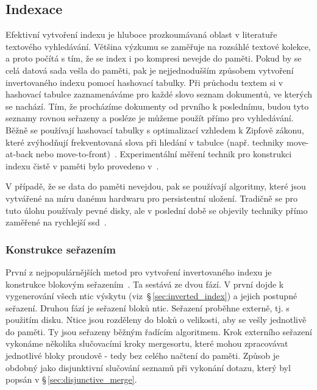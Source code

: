 \documentclass[11pt,letterpaper,oneside,openright]{book}
\begin{document}
\subsection{Indexace}
Efektivní vytvoření indexu je hluboce prozkoumávaná oblast v literatuře
textového vyhledávání. Většina výzkumu se zaměřuje na rozsáhlé textové kolekce,
a proto počítá s tím, že se index i po kompresi nevejde do paměti. Pokud by se
celá datová sada vešla do paměti, pak je nejjednodušším způsobem vytvoření
invertovaného indexu pomocí hashovací tabulky. Při průchodu textem si v
hashovací tabulce zaznamenáváme pro každé slovo seznam dokumentů, ve kterých se
nachází. Tím, že procházíme dokumenty od prvního k poslednímu, budou tyto
seznamy rovnou seřazeny a posléze je můžeme použít přímo pro vyhledávání. Běžně
se používají hashovací tabulky s optimalizací vzhledem k Zipfově zákonu, které
zvýhodňují frekventovaná slova při hledání v tabulce (např. techniky
move-at-back nebo move-to-front)~\cite{ZOBEL2001271}. Experimentální měření
technik pro konstrukci indexu čistě v paměti bylo provedeno
v~\cite{Buttcher05memorymanagement}.

V případě, že se data do paměti nevejdou, pak se používají algoritmy, které
jsou vytvářené na míru danému hardwaru pro persistentní uložení. Tradičně se
pro tuto úlohu používaly pevné disky, ale v poslední době se objevily techniky
přímo zaměřené na rychlejší ssd~\cite{Jung201525}.

\subsubsection{Konstrukce seřazením}
První z nejpopulárnějších metod pro vytvoření invertovaného indexu je
konstrukce blokovým seřazením~\citep[kap.~3]{Manning:2008:IIR:1394399}. Ta
sestává ze dvou fází.  V první dojde k vygenerování všech ntic výskytu
(viz~\S\,\ref{sec:inverted_index}) a jejich postupné seřazení. Druhou fází je
seřazení bloků ntic. Seřazení proběhne externě, tj. s použitím disku. Ntice
jsou rozděleny do bloků o velikosti, aby se vešly jednotlivě do paměti. Ty jsou
seřazeny běžným řadícím algoritmem. Krok externího seřazení vykonáme několika
slučovacími kroky mergesortu, které mohou zpracovávat jednotlivé bloky proudově
- tedy bez celého načtení do paměti.  Způsob je obdobný jako disjunktivní
slučování seznamů při vykonání dotazu, který byl popsán v
\S\,\ref{sec:disjunctive_merge}.
\end{document}
